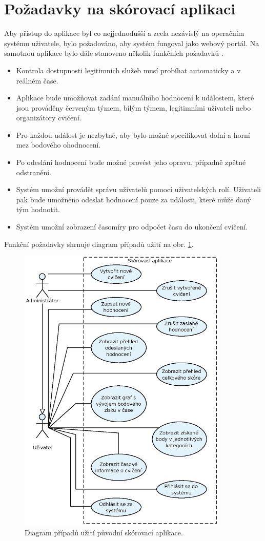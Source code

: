 \documentclass[
  digital,
  twoside,
  table, 
  nolof, 
  nolot
]{fithesis3}
\begin{document}
\section{Požadavky na skórovací aplikaci}

Aby přístup do aplikace byl co nejjednodušší a zcela nezávislý na operačním systému uživatele, bylo požadováno, aby systém fungoval jako webový portál. Na samotnou aplikace bylo dále stanoveno několik funkčních požadavků \cite{Kostelnik2016thesis}.

\begin{itemize}
\item Kontrola dostupnosti legitimních služeb musí probíhat automaticky a v reálném čase.
\item Aplikace bude umožňovat zadání manuálního hodnocení k událostem, které jsou prováděny červeným týmem, bílým týmem, legitimními uživateli nebo organizátory cvičení.
\item Pro každou událost je nezbytné, aby bylo možné specifikovat dolní a horní mez bodového ohodnocení.
\item Po odeslání hodnocení bude možné provést jeho opravu, případně zpětné odstranění.
\item Systém umožní provádět správu uživatelů pomocí uživatelských rolí. Uživateli pak bude umožněno odeslat hodnocení pouze za události, které může daný tým hodnotit.
\item Systém umožní zobrazení časomíry pro odpočet času do ukončení cvičení.
\end{itemize}

Funkční požadavky shrnuje diagram případů užití na obr. \ref{fig:useCase1}.

\begin{figure}[h!]
    \centering
    \includegraphics[width=10cm]{images/Use-case-1.eps}
    \caption{Diagram případů užití původní skórovací aplikace.}
    \label{fig:useCase1}
\end{figure}
\end{document}
